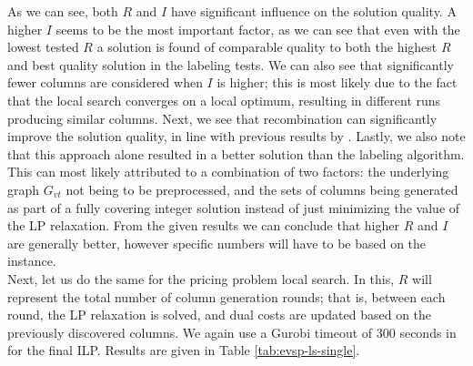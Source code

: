 \documentclass[]{article}
\begin{document}
As we can see, both $R$ and $I$ have significant influence on the solution quality. A higher $I$ seems to be the most important factor, as we can see that even with the lowest tested $R$ a solution is found of comparable quality to both the highest $R$ and best quality solution in the labeling tests. We can also see that significantly fewer columns are considered when $I$ is higher; this is most likely due to the fact that the local search converges on a local optimum, resulting in different runs producing similar columns. Next, we see that recombination can significantly improve the solution quality, in line with previous results by \citet{Bosch21}. Lastly, we also note that this approach alone resulted in a better solution than the labeling algorithm. This can most likely attributed to a combination of two factors: the underlying graph $G_{vt}$ not being to be preprocessed, and the sets of columns being generated as part of a fully covering integer solution instead of just minimizing the value of the LP relaxation. From the given results we can conclude that higher $R$ and $I$ are generally better, however specific numbers will have to be based on the instance.  \\

Next, let us do the same for the pricing problem local search. In this, $R$ will represent the total number of column generation rounds; that is, between each round, the LP relaxation is solved, and dual costs are updated based on the previously discovered columns. We again use a Gurobi timeout of 300 seconds in for the final ILP. Results are given in Table \ref{tab:evsp-ls-single}.
\end{document}
